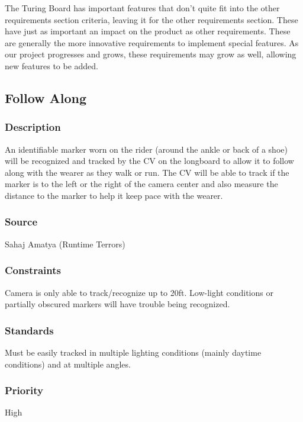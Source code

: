 The Turing Board has important features that don't quite fit into the other requirements section criteria, leaving it for the other requirements section. These have just as important an impact on the product as other requirements. These are generally the more innovative requirements to implement special features. As our project progresses and grows, these requirements may grow as well, allowing new features to be added.

\subsection{Follow Along}
\subsubsection{Description}
An identifiable marker worn on the rider (around the ankle or back of a shoe) will be recognized and tracked by the CV on the longboard to allow it to follow along with the wearer as they walk or run. The CV will be able to track if the marker is to the left or the right of the camera center and also measure the distance to the marker to help it keep pace with the wearer.
\subsubsection{Source}
Sahaj Amatya (Runtime Terrors)
\subsubsection{Constraints}
Camera is only able to track/recognize up to 20ft. Low-light conditions or partially obscured markers will have trouble being recognized.
\subsubsection{Standards}
Must be easily tracked in multiple lighting conditions (mainly daytime conditions) and at multiple angles.
\subsubsection{Priority}
High
